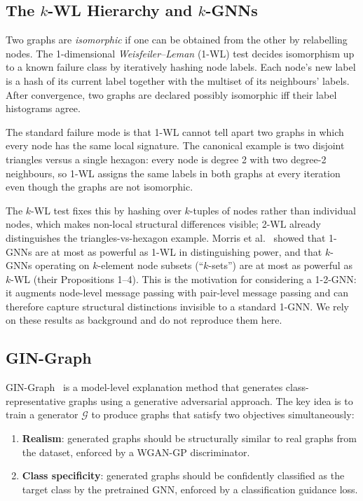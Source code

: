 \documentclass[12pt,a4paper]{article}
\begin{document}
\subsection{The $k$-WL Hierarchy and $k$-GNNs}

Two graphs are \emph{isomorphic} if one can be obtained from the other by relabelling nodes. The 1-dimensional \emph{Weisfeiler--Leman} (1-WL) test decides isomorphism up to a known failure class by iteratively hashing node labels. Each node's new label is a hash of its current label together with the multiset of its neighbours' labels. After convergence, two graphs are declared possibly isomorphic iff their label histograms agree.

The standard failure mode is that 1-WL cannot tell apart two graphs in which every node has the same local signature. The canonical example is two disjoint triangles versus a single hexagon: every node is degree 2 with two degree-2 neighbours, so 1-WL assigns the same labels in both graphs at every iteration even though the graphs are not isomorphic.

The $k$-WL test fixes this by hashing over $k$-tuples of nodes rather than individual nodes, which makes non-local structural differences visible; 2-WL already distinguishes the triangles-vs-hexagon example. Morris et al.~\cite{morris2019weisfeiler} showed that 1-GNNs are at most as powerful as 1-WL in distinguishing power, and that $k$-GNNs operating on $k$-element node subsets (``$k$-sets'') are at most as powerful as $k$-WL (their Propositions 1--4). This is the motivation for considering a 1-2-GNN: it augments node-level message passing with pair-level message passing and can therefore capture structural distinctions invisible to a standard 1-GNN. We rely on these results as background and do not reproduce them here.

\subsection{GIN-Graph}

GIN-Graph~\cite{sun2025gingraph} is a model-level explanation method that generates class-representative graphs using a generative adversarial approach. The key idea is to train a generator $\mathcal{G}$ to produce graphs that satisfy two objectives simultaneously:
\begin{enumerate}[nosep]
  \item \textbf{Realism}: generated graphs should be structurally similar to real graphs from the dataset, enforced by a WGAN-GP discriminator.
  \item \textbf{Class specificity}: generated graphs should be confidently classified as the target class by the pretrained GNN, enforced by a classification guidance loss.
\end{enumerate}
\end{document}
